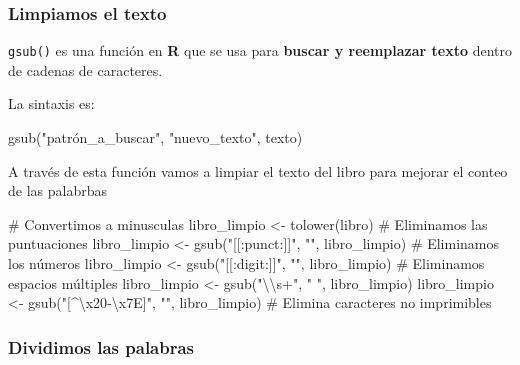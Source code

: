 \documentclass[
  letterpaper,
  DIV=11,
  numbers=noendperiod]{scrreprt}
\newenvironment{Shaded}{\begin{snugshade}}{\end{snugshade}}
\newcommand{\CommentTok}[1]{\textcolor[rgb]{0.37,0.37,0.37}{#1}}
\newcommand{\FunctionTok}[1]{\textcolor[rgb]{0.28,0.35,0.67}{#1}}
\newcommand{\NormalTok}[1]{\textcolor[rgb]{0.00,0.23,0.31}{#1}}
\newcommand{\OtherTok}[1]{\textcolor[rgb]{0.00,0.23,0.31}{#1}}
\newcommand{\SpecialCharTok}[1]{\textcolor[rgb]{0.37,0.37,0.37}{#1}}
\newcommand{\StringTok}[1]{\textcolor[rgb]{0.13,0.47,0.30}{#1}}
\begin{document}
\subsubsection{Limpiamos el texto}\label{limpiamos-el-texto}

\texttt{gsub()} es una función en \textbf{R} que se usa para
\textbf{buscar y reemplazar texto} dentro de cadenas de caracteres.

La sintaxis es:

\begin{Shaded}
\begin{Highlighting}[]
\FunctionTok{gsub}\NormalTok{(}\StringTok{"patrón\_a\_buscar"}\NormalTok{, }\StringTok{"nuevo\_texto"}\NormalTok{, texto)}
\end{Highlighting}
\end{Shaded}

A través de esta función vamos a limpiar el texto del libro para mejorar
el conteo de las palabrbas

\begin{Shaded}
\begin{Highlighting}[]
\CommentTok{\# Convertimos a minusculas}
\NormalTok{libro\_limpio }\OtherTok{\textless{}{-}} \FunctionTok{tolower}\NormalTok{(libro)  }
\CommentTok{\# Eliminamos las puntuaciones}
\NormalTok{libro\_limpio }\OtherTok{\textless{}{-}} \FunctionTok{gsub}\NormalTok{(}\StringTok{"[[:punct:]]"}\NormalTok{, }\StringTok{""}\NormalTok{, libro\_limpio)  }
\CommentTok{\# Eliminamos los números}
\NormalTok{libro\_limpio }\OtherTok{\textless{}{-}} \FunctionTok{gsub}\NormalTok{(}\StringTok{"[[:digit:]]"}\NormalTok{, }\StringTok{""}\NormalTok{, libro\_limpio) }
\CommentTok{\# Eliminamos espacios múltiples}
\NormalTok{libro\_limpio }\OtherTok{\textless{}{-}} \FunctionTok{gsub}\NormalTok{(}\StringTok{"}\SpecialCharTok{\textbackslash{}\textbackslash{}}\StringTok{s+"}\NormalTok{, }\StringTok{" "}\NormalTok{, libro\_limpio) }
\NormalTok{libro\_limpio }\OtherTok{\textless{}{-}} \FunctionTok{gsub}\NormalTok{(}\StringTok{"[\^{}}\SpecialCharTok{\textbackslash{}x20}\StringTok{{-}}\SpecialCharTok{\textbackslash{}x7E}\StringTok{]"}\NormalTok{, }\StringTok{""}\NormalTok{, libro\_limpio)  }\CommentTok{\# Elimina caracteres no imprimibles}
\end{Highlighting}
\end{Shaded}

\subsubsection{Dividimos las palabras}\label{dividimos-las-palabras}
\end{document}
